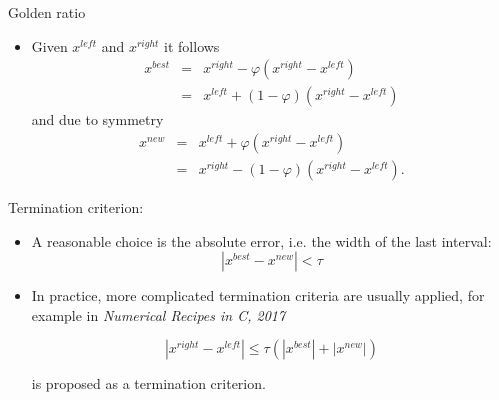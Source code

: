 \documentclass[11pt,compress,t,notes=noshow, xcolor=table]{beamer}
\begin{document}
\begin{vbframe}{Golden ratio}
\begin{itemize}
\framebreak

\item Given $x^{left}$ and $x^{right}$ it follows
\begin{eqnarray*}
x^{best}&=&x^{right}-\varphi(x^{right}-x^{left})\\
&=&x^{left}+(1-\varphi)(x^{right}-x^{left})
\end{eqnarray*}
and due to symmetry
\begin{eqnarray*}
x^{new}&=& x^{left}+\varphi(x^{right}-x^{left})\\ &=& x^{right}-(1-\varphi)(x^{right}-x^{left}).
\end{eqnarray*}
\end{itemize}

\framebreak 

Termination criterion:

  \begin{itemize}
    \item A reasonable choice is the absolute error, i.e. the width of the last interval:
    $$
    |x^{best}-x^{new}| < \tau
    $$
    \item In practice, more complicated termination criteria are usually applied, for example in \emph{Numerical Recipes in C, 2017}

    $$
    |x^{right}-x^{left}| \le \tau (|x^{best}| + |x^{new}|)
    $$

    is proposed as a termination criterion.

\end{itemize}

\end{vbframe}
\end{document}

